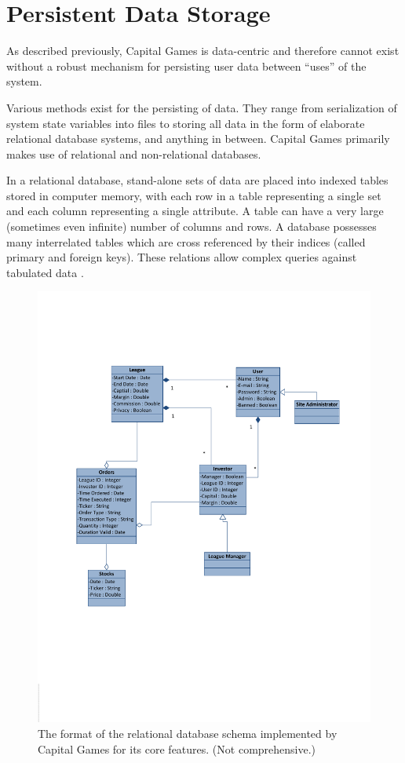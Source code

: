 \section{Persistent Data Storage}

As described previously, Capital Games is data-centric
and therefore cannot exist without a robust mechanism
for persisting user data between ``uses'' of the system.

Various methods exist for the persisting of data. They range
from serialization of system state variables into files
to storing all data in the form of elaborate relational
database systems, and anything in between. Capital Games
primarily makes use of relational and non-relational databases.

In a relational database, stand-alone sets of data are placed
into indexed tables stored in computer memory, with each row in a table
representing a single set and each column representing a single
attribute. A table can have a very large (sometimes even 
infinite) number of columns and rows. A database possesses
many interrelated tables which are cross referenced by their
indices (called primary and foreign keys). These relations
allow complex queries against tabulated data \cite{wiki:rdb}.

\begin{figure}[ht]
\centering
\includegraphics[width=6in]{./img/domainModel.pdf}
\caption{The format of the relational database
schema implemented by Capital Games for its core features.
(Not comprehensive.)}
\end{figure}

